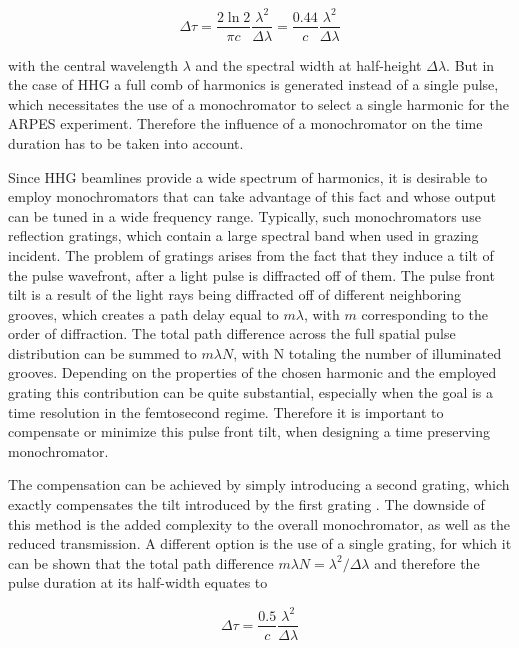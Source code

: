 \begin{equation}
	\Delta\tau = \frac{2 \ln{2}}{\pi c}\frac{\lambda^2}{\Delta\lambda} = \frac{0.44}{c}\frac{\lambda^2}{\Delta\lambda}
\end{equation}

with the central wavelength $\lambda$ and the spectral width at half-height $\Delta\lambda$.
But in the case of HHG a full comb of harmonics is generated instead of a single pulse, which necessitates the use of a monochromator to select a single harmonic for the ARPES experiment.
Therefore the influence of a monochromator on the time duration has to be taken into account.

Since HHG beamlines provide a wide spectrum of harmonics, it is desirable to employ monochromators that can take advantage of this fact and whose output can be tuned in a wide frequency range.
Typically, such monochromators use reflection gratings, which contain a large spectral band when used in grazing incident.
The problem of gratings arises from the fact that they induce a tilt of the pulse wavefront, after a light pulse is diffracted off of them.
The pulse front tilt is a result of the light rays being diffracted off of different neighboring grooves, which creates a path delay equal to $m\lambda$, with $m$ corresponding to the order of diffraction.
The total path difference across the full spatial pulse distribution can be summed to $m\lambda N$, with N totaling the number of illuminated grooves.
Depending on the properties of the chosen harmonic and the employed grating this contribution can be quite substantial, especially when the goal is a time resolution in the femtosecond regime.
Therefore it is important to compensate or minimize this pulse front tilt, when designing a time preserving monochromator.

The compensation can be achieved by simply introducing a second grating, which exactly compensates the tilt introduced by the first grating \cite{villoresi_compensation_1999}.
The downside of this method is the added complexity to the overall monochromator, as well as the reduced transmission.
A different option is the use of a single grating, for which it can be shown that the total path difference $m\lambda N=\lambda^2/\Delta\lambda$ \cite{samson_j_a_vacuum_1998} and therefore the pulse duration at its half-width equates to

\begin{equation}
	\Delta\tau = \frac{0.5}{c}\frac{\lambda^2}{\Delta\lambda}
\end{equation}

